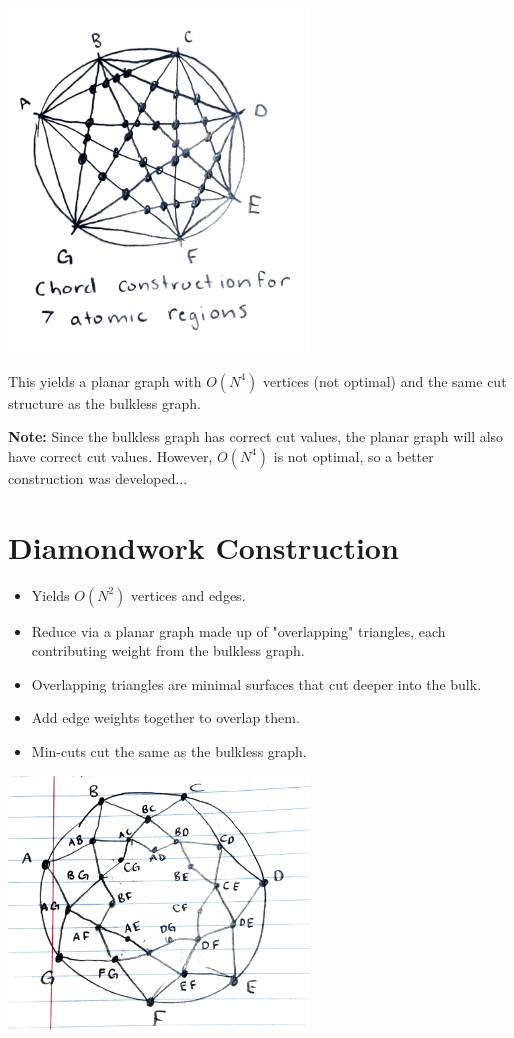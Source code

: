 \documentclass[12pt]{article}
\begin{document}
\begin{center}
    \includegraphics[width=0.6\textwidth]{chord_construct.pdf}
\end{center}

This yields a planar graph with \( O(N^4) \) vertices (not optimal) and the same cut structure as the bulkless graph.

\textbf{Note:} Since the bulkless graph has correct cut values, the planar graph will also have correct cut values. However, \( O(N^4) \) is not optimal, so a better construction was developed...

\section*{Diamondwork Construction}
\begin{itemize}
    \item Yields \( O(N^2) \) vertices and edges.
    \item Reduce via a planar graph made up of "overlapping" triangles, each contributing weight from the bulkless graph.
    \item Overlapping triangles are minimal surfaces that cut deeper into the bulk.
    \item Add edge weights together to overlap them.
    \item Min-cuts cut the same as the bulkless graph.
\end{itemize}

\begin{center}
    \includegraphics[width=0.6\textwidth]{edge_weights.pdf}
\end{center}
\end{document}
